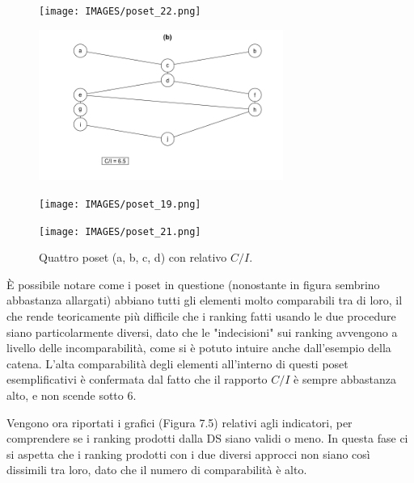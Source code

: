 \documentclass{report}
\begin{document}
\begin{figure}[H]
  \centering
  \begin{minipage}[b]{0.4\textwidth}
    \texttt{[image: IMAGES/poset\_22.png]}
  \end{minipage}
  \hfill
  \begin{minipage}[b]{0.4\textwidth}
    \includegraphics[width=8cm]{IMAGES/poset_18.png}
  \end{minipage}
  \hfill
  \begin{minipage}[b]{0.4\textwidth}
    \texttt{[image: IMAGES/poset\_19.png]}
  \end{minipage}
  \hfill
  \begin{minipage}[b]{0.4\textwidth}
    \texttt{[image: IMAGES/poset\_21.png]}
  \end{minipage}
  \caption{Quattro poset (a, b, c, d) con relativo $C/I$.}
\end{figure}

È possibile notare come i poset in questione (nonostante in figura sembrino abbastanza allargati) abbiano tutti gli elementi molto comparabili tra di loro, il che rende teoricamente più difficile che i ranking fatti usando le due procedure siano particolarmente diversi, dato che le "indecisioni" sui ranking avvengono a livello delle incomparabilità, come si è potuto intuire anche dall'esempio della catena. L'alta comparabilità degli elementi all'interno di questi poset esemplificativi è confermata dal fatto che il rapporto $C/I$ è sempre abbastanza alto, e non scende sotto 6.


Vengono ora riportati i grafici (Figura 7.5) relativi agli indicatori, per comprendere se i ranking prodotti dalla DS siano validi o meno. In questa fase ci si aspetta che i ranking prodotti con i due diversi approcci non siano così dissimili tra loro, dato che il numero di comparabilità è alto.
\end{document}
